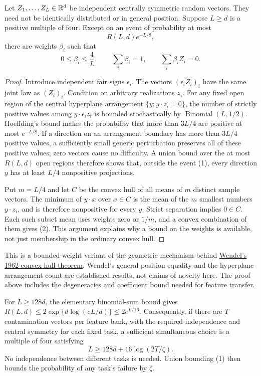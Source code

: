 \documentclass[11pt]{article}
\begin{document}
\begin{lemma}
Let $Z_1,\ldots,Z_L\in\mathbb R^d$ be independent centrally symmetric random
vectors. They need not be identically distributed or in general position.
Suppose $L\ge d$ is a positive multiple of four. Except on an event of
probability at most
\[
                       R(L,d)e^{-L/8},                 \tag{1}
\]
there are weights $\beta_i$ such that
\[
 0\le\beta_i\le\frac4L,\qquad \sum_i\beta_i=1,
                  \qquad\sum_i\beta_iZ_i=0.           \tag{2}
\]
\end{lemma}
\begin{proof}
Introduce independent fair signs $\epsilon_i$. The vectors
$(\epsilon_iZ_i)_i$ have the same joint law as $(Z_i)_i$. Condition on
arbitrary realizations $z_i$. For any fixed open region of the central
hyperplane arrangement $\{y:y\cdot z_i=0\}$, the number of strictly
positive values among $y\cdot\epsilon_i z_i$ is bounded stochastically
by $\operatorname{Binomial}(L,1/2)$. Hoeffding's bound makes the probability
that more than $3L/4$ are positive at most $e^{-L/8}$.
If a direction on an arrangement boundary has more than $3L/4$ positive
values, a sufficiently small generic perturbation preserves all of
these positive values; zero vectors cause no difficulty. A union bound
over the at most $R(L,d)$ open regions therefore shows that, outside
the event (1), every direction $y$ has at least $L/4$ nonpositive
projections.

Put $m=L/4$ and let $C$ be the convex hull of all means of $m$ distinct
sample vectors. The minimum of $y\cdot x$ over $x\in C$ is the mean of
the $m$ smallest numbers $y\cdot z_i$, and is therefore nonpositive
for every $y$. Strict separation implies $0\in C$. Each such subset
mean uses weights zero or $1/m$, and a convex combination of them gives
(2). This argument explains why a bound on the weights is available,
not just membership in the ordinary convex hull.
\end{proof}

This is a bounded-weight variant of the geometric mechanism behind
\href{https://journals.msp.org/mscand/article/view/2688}{Wendel's 1962
convex-hull theorem}. Wendel's general-position equality and the
hyperplane-arrangement count are established results, not claims of
novelty here. The proof above includes the degeneracies and coefficient
bound needed for feature transfer.

For $L\ge128d$, the elementary binomial-sum bound gives
$R(L,d)\le2\exp\{d\log(eL/d)\}\le2e^{L/16}$.
Consequently, if there are $T$ contamination vectors per feature bank,
with the required independence and central symmetry for each fixed task,
a sufficient simultaneous choice is a multiple of four satisfying
\[
              L\ge128d+16\log(2T/\zeta).              \tag{3}
\]
No independence between different tasks is needed. Union bounding (1)
then bounds the probability of any task's failure by $\zeta$.
\end{document}
